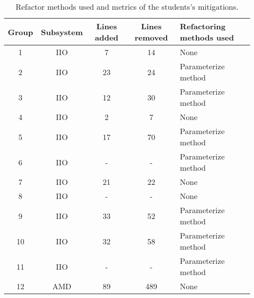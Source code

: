 \begin{table}
\begin{tabular}{ | c | c | c | c | m{6em} | }

\hline

\textbf{Group} & \textbf{Subsystem} & \textbf{Lines added} & \textbf{Lines removed} & \textbf{Refactoring methods used}
\\ \hline 

1 & IIO & 7 & 14 & None \\ \hline
2 & IIO & 23 & 24 & Parameterize method \\ \hline
3 & IIO & 12 & 30 & Parameterize method \\ \hline
4 & IIO & 2 & 7 & None \\ \hline
5 & IIO & 17 & 70 & Parameterize method \\ \hline
6 & IIO & - & - & Parameterize method \\ \hline
7 & IIO & 21 & 22  & None \\ \hline
8 & IIO & - & - & None \\ \hline
9 & IIO & 33 & 52 & Parameterize method \\ \hline
10 & IIO & 32 & 58 & Parameterize method \\ \hline
11 & IIO & - & - & Parameterize method \\ \hline
12 & AMD & 89 & 489 & None \\ \hline

\hline
\end{tabular}
\caption{Refactor methods used and metrics of the students's mitigations.}
\label{tab:stu}
\end{table}
